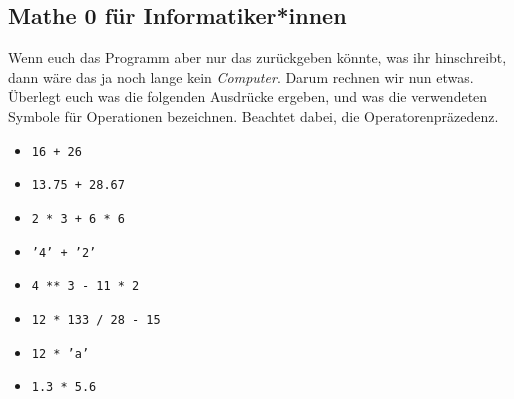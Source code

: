 \subsection{Mathe 0 für Informatiker*innen}
Wenn euch das Programm aber nur das zurückgeben könnte, was ihr hinschreibt,
dann wäre das ja noch lange kein \textit{Computer}. Darum rechnen wir nun etwas.
Überlegt euch was die folgenden Ausdrücke ergeben, und was die verwendeten
Symbole für Operationen bezeichnen. Beachtet dabei, die Operatorenpräzedenz.

\begin{multicols}{3}
    \begin{itemize}
        \item \texttt{16 + 26}
        \item \texttt{13.75 + 28.67}
        \item \texttt{2 * 3 + 6 * 6}
        \item \texttt{'4' + '2'}
        \item \texttt{4 ** 3 - 11 * 2}
        \item \texttt{12 * 133 / 28 - 15}
        \item \texttt{12 * 'a'}
        \item \texttt{1.3 * 5.6}
    \end{itemize}
\end{multicols}

